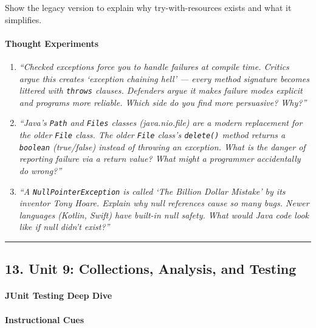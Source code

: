 \documentclass[
  justified,
  openright,
]{tufte-book}
\let\subsubsection\paragraph
\let\paragraph\paragraph
\let\subsubsection\paragraph
\let\paragraph\paragraph
\begin{document}
Show the legacy version to explain why try-with-resources exists and
what it simplifies.

\paragraph{Thought Experiments}\label{thought-experiments-10}

\begin{enumerate}
\def\labelenumi{\arabic{enumi}.}
\item
  \emph{``Checked exceptions force you to handle failures at compile
  time. Critics argue this creates `exception chaining hell' --- every
  method signature becomes littered with \texttt{throws} clauses.
  Defenders argue it makes failure modes explicit and programs more
  reliable. Which side do you find more persuasive? Why?''}
\item
  \emph{``Java's \texttt{Path} and \texttt{Files} classes
  (java.nio.file) are a modern replacement for the older \texttt{File}
  class. The older \texttt{File} class's \texttt{delete()} method
  returns a \texttt{boolean} (true/false) instead of throwing an
  exception. What is the danger of reporting failure via a return value?
  What might a programmer accidentally do wrong?''}
\item
  \emph{``A \texttt{NullPointerException} is called `The Billion Dollar
  Mistake' by its inventor Tony Hoare. Explain why null references cause
  so many bugs. Newer languages (Kotlin, Swift) have built-in null
  safety. What would Java code look like if null didn't exist?''}
\end{enumerate}

\begin{center}\rule{0.5\linewidth}{0.5pt}\end{center}

\subsection{13. Unit 9: Collections, Analysis, and
Testing}\label{unit-9-collections-analysis-and-testing}

\subsubsection{JUnit Testing Deep Dive}\label{junit-testing-deep-dive}

\paragraph{Instructional Cues}\label{instructional-cues-10}
\end{document}
